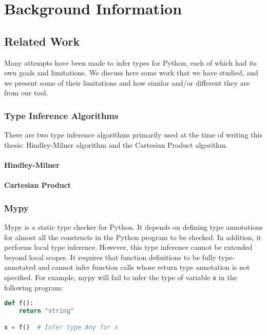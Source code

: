
\chapter{Background Information}\label{chapter:background}

\section{Related Work}
Many attempts have been made to infer types for Python, each of which had its own goals and limitations. We discuss here some work that we have studied, and we present some of their limitations and how similar and/or different they are from our tool.

\subsection{Type Inference Algorithms}
There are two type inference algorithms primarily used at the time of writing this thesis: Hindley-Milner algorithm and the Cartesian Product algorithm.

\subsubsection{Hindley-Milner}
\subsubsection{Cartesian Product}

\subsection{Mypy \cite{mypy}}
Mypy is a static type checker for Python. It depends on defining type annotations for almost all the constructs in the Python program to be checked. In addition, it performs local type inference. However, this type inference cannot be extended beyond local scopes. It requires that function definitions to be fully type-annotated and cannot infer function calls whose return type annotation is not specified. For example, mypy will fail to infer the type of variable \lstinline|x| in the following program:

\begin{lstlisting}[language=Python]
def f():
	return "string"

x = f()  # Infer type Any for x
\end{lstlisting}

